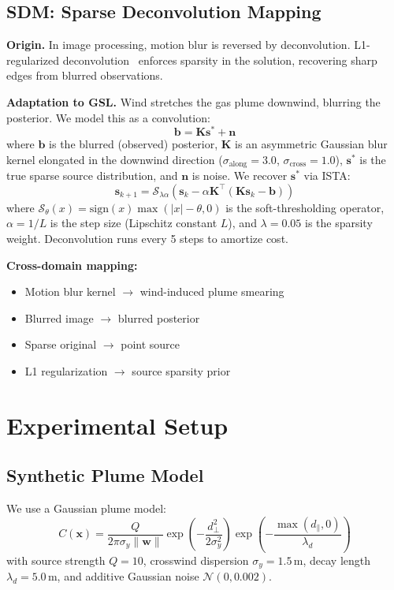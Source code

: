 \documentclass[conference]{IEEEtran}
\begin{document}
\subsection{SDM: Sparse Deconvolution Mapping}
\label{sec:sdm}

\textbf{Origin.} In image processing, motion blur is reversed by deconvolution.
L1-regularized deconvolution~\cite{beck2009fast} enforces sparsity in the solution, recovering sharp edges from blurred observations.

\textbf{Adaptation to GSL.} Wind stretches the gas plume downwind, blurring the posterior.
We model this as a convolution:
\begin{equation}
    \mathbf{b} = \mathbf{K} \mathbf{s}^* + \mathbf{n}
\end{equation}
where $\mathbf{b}$ is the blurred (observed) posterior, $\mathbf{K}$ is an asymmetric Gaussian blur kernel elongated in the downwind direction ($\sigma_{\text{along}} = 3.0$, $\sigma_{\text{cross}} = 1.0$), $\mathbf{s}^*$ is the true sparse source distribution, and $\mathbf{n}$ is noise.
We recover $\mathbf{s}^*$ via ISTA:
\begin{equation}
    \mathbf{s}_{k+1} = \mathcal{S}_{\lambda\alpha}\!\left(\mathbf{s}_k - \alpha \mathbf{K}^\top(\mathbf{K}\mathbf{s}_k - \mathbf{b})\right)
\end{equation}
where $\mathcal{S}_\theta(x) = \text{sign}(x)\max(|x|-\theta, 0)$ is the soft-thresholding operator, $\alpha = 1/L$ is the step size (Lipschitz constant $L$), and $\lambda = 0.05$ is the sparsity weight.
Deconvolution runs every 5 steps to amortize cost.

\textbf{Cross-domain mapping:}
\begin{itemize}
    \item Motion blur kernel $\to$ wind-induced plume smearing
    \item Blurred image $\to$ blurred posterior
    \item Sparse original $\to$ point source
    \item L1 regularization $\to$ source sparsity prior
\end{itemize}

\section{Experimental Setup}

\subsection{Synthetic Plume Model}
We use a Gaussian plume model:
\begin{equation}
    C(\mathbf{x}) = \frac{Q}{2\pi \sigma_y \|\mathbf{w}\|} \exp\!\left(-\frac{d_\perp^2}{2\sigma_y^2}\right) \exp\!\left(-\frac{\max(d_\parallel, 0)}{\lambda_d}\right)
\end{equation}
with source strength $Q = 10$, crosswind dispersion $\sigma_y = 1.5$\,m, decay length $\lambda_d = 5.0$\,m, and additive Gaussian noise $\mathcal{N}(0, 0.002)$.
\end{document}
